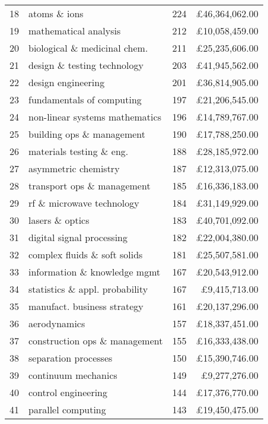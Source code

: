\begin{spacing}{0.9}
\begin{longtable}[c]{r|>{\raggedleft\arraybackslash}m{6.5cm}|>{\raggedleft\arraybackslash}m{1.9cm}|r}
{18} & {atoms \& ions} & {224} & {\pounds46,364,062.00}\\
{19} & {mathematical analysis} & {212} & {\pounds10,058,459.00}\\
{20} & {biological \& medicinal chem.} & {211} & {\pounds25,235,606.00}\\
{21} & {design \& testing technology} & {203} & {\pounds41,945,562.00}\\
{22} & {design engineering} & {201} & {\pounds36,814,905.00}\\
{23} & {fundamentals of computing} & {197} & {\pounds21,206,545.00}\\
{24} & {non-linear systems mathematics} & {196} & {\pounds14,789,767.00}\\
{25} & {building ops \& management} & {190} & {\pounds17,788,250.00}\\
{26} & {materials testing \& eng.} & {188} & {\pounds28,185,972.00}\\
{27} & {asymmetric chemistry} & {187} & {\pounds12,313,075.00}\\
{28} & {transport ops \& management} & {185} & {\pounds16,336,183.00}\\
{29} & {rf \& microwave technology} & {184} & {\pounds31,149,929.00}\\
{30} & {lasers \& optics} & {183} & {\pounds40,701,092.00}\\
{31} & {digital signal processing} & {182} & {\pounds22,004,380.00}\\
{32} & {complex fluids \& soft solids} & {181} & {\pounds25,507,581.00}\\
{33} & {information \& knowledge mgmt} & {167} & {\pounds20,543,912.00}\\
{34} & {statistics \& appl. probability} & {167} & {\pounds9,415,713.00}\\
{35} & {manufact. business strategy} & {161} & {\pounds20,137,296.00}\\
{36} & {aerodynamics} & {157} & {\pounds18,337,451.00}\\
{37} & {construction ops \& management} & {155} & {\pounds16,333,438.00}\\
{38} & {separation processes} & {150} & {\pounds15,390,746.00}\\
{39} & {continuum mechanics} & {149} & {\pounds9,277,276.00}\\
{40} & {control engineering} & {144} & {\pounds17,376,770.00}\\
{41} & {parallel computing} & {143} & {\pounds19,450,475.00}\\

\end{longtable}
\end{spacing}
